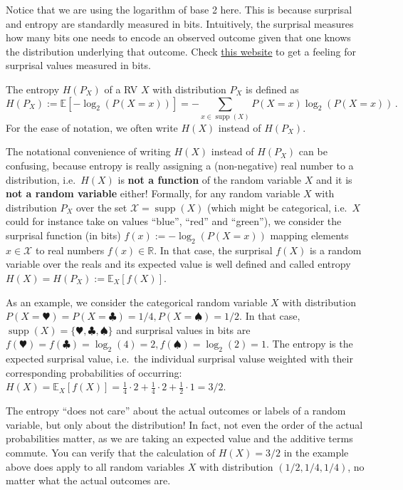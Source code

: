 \documentclass[11pt,leqno,a4paper]{report}\usepackage[]{graphicx}\usepackage[]{color}
\newcommand{\supp}{\operatorname{supp}}
\newcommand{\E}{\mathbb{E}}
\begin{document}
Notice that we are using the logarithm of base 2 here. This is because surprisal and entropy are standardly measured in bits. Intuitively, the surprisal measures how many bits one needs to encode an observed outcome given that one knows the distribution underlying that outcome. Check \href{http://www.umsl.edu/~fraundorfp/egsurpriNOLOGS.html}{this website} to get a feeling for surprisal values measured in bits.

\begin{Definition}[Entropy]
The entropy $H(P_X)$ of a RV $ X $ with distribution $P_X$ is defined as 
$$H(P_X) := \E[-\log_{2}(P(X=x))] = - \!\! \sum_{x \in \supp(X)} P(X=x) \log_2(P(X=x)) \, .$$ 
For the ease of notation, we often write $H(X)$ instead of $H(P_X)$.
\end{Definition}

The notational convenience of writing $H(X)$ instead of $H(P_X)$ can be confusing, because entropy is really assigning a (non-negative) real number to a distribution, i.e.\ $H(X)$ is {\bf not a function} of the random variable $X$ and it is {\bf not a random variable} either! Formally, for any random variable $X$ with distribution $P_X$ over the set $\mathcal{X}=\supp(X)$ (which might be categorical, i.e.\ $X$ could for instance take on values ``blue'', ``red'' and ``green''), we consider the surprisal function (in bits) $f(x) := -\log_2(P(X=x))$ mapping elements $x \in \mathcal{X}$ to real numbers $f(x) \in \mathbb{R}$. In that case, the surprisal $f(X)$ is a random variable over the reals and its expected value is well defined and called entropy $H(X) = H(P_X) := \E_X[f(X)]$. 

As an example, we consider the categorical random variable $X$ with distribution $P(X=\varheart)=P(X=\clubsuit)=1/4, P(X=\spadesuit)=1/2$. In that case, $\supp(X) = \{\varheart, \clubsuit, \spadesuit \}$ and surprisal values in bits are $f(\varheart)=f(\clubsuit)=\log_2(4)=2, f(\spadesuit)=\log_2(2)=1$. The entropy is the expected surprisal value, i.e.\ the individual surprisal valuse weighted with their corresponding probabilities of occurring: $H(X) = \E_X[f(X)] = \frac{1}{4} \cdot 2 + \frac{1}{4} \cdot 2 + \frac{1}{2} \cdot 1 = 3/2$. 

The entropy ``does not care'' about the actual outcomes or labels of a random variable, but only about the distribution! In fact, not even the order of the actual probabilities matter, as we are taking an expected value and the additive terms commute. You can verify that the calculation of $H(X)=3/2$ in the example above does apply to all random variables $X$ with distribution $(1/2, 1/4, 1/4)$, no matter what the actual outcomes are. 
\end{document}
